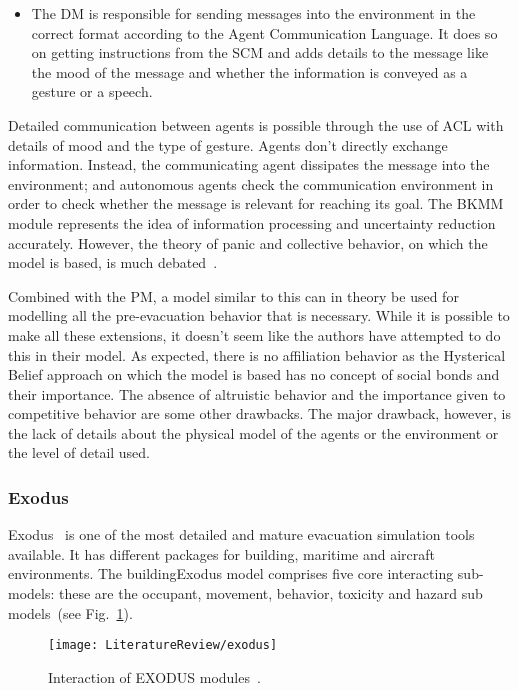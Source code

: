 \begin{itemize}
\item
The DM is responsible for sending messages into the environment in the correct format according to the Agent Communication Language. It does so on getting instructions from the SCM and adds details to the message like the mood of the message and whether the information is conveyed as a gesture or a speech.
\end{itemize}

Detailed communication between agents is possible through the use of ACL with details of mood and the type of gesture. Agents don't directly exchange information. Instead, the communicating agent dissipates the message into the environment; and autonomous agents check the communication environment in order to check whether the message is relevant for reaching its goal. The BKMM module represents the idea of information processing and uncertainty reduction accurately. However, the theory of panic and collective behavior, on which the model is based, is much debated~\cite{Torres:2010tj, Sime:1995uu}.

Combined with the PM, a model similar to this can in theory be used for modelling all the pre-evacuation behavior that is necessary. While it is possible to make all these extensions, it doesn't seem like the authors have attempted to do this in their model. As expected, there is no affiliation behavior as the Hysterical Belief approach on which the model is based has no concept of social bonds and their importance. The absence of altruistic behavior and the importance given to competitive behavior are some other drawbacks. The major drawback, however, is the lack of details about the physical model of the agents or the environment or the level of detail used.

\subsubsection{Exodus}

Exodus~\cite{Owen:1996jh} is one of the most detailed and mature evacuation simulation tools available. It has different packages for building, maritime and aircraft environments. The buildingExodus model comprises five core interacting sub-models: these are the occupant, movement, behavior, toxicity and hazard sub models~(see Fig.~\ref{fig:ExodusDiagram}).

\begin{figure}[!htb]
\centering
\texttt{[image: LiteratureReview/exodus]}
\caption[EXODUS model]{Interaction of EXODUS modules~\cite{Gwynne:2001te}.}
\label{fig:ExodusDiagram}
\end{figure}


